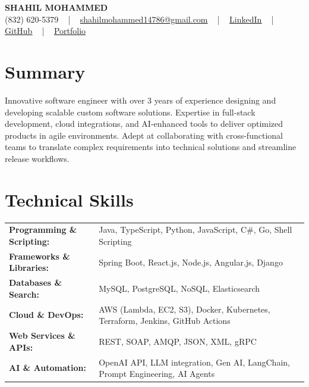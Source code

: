 \documentclass[letterpaper,11pt]{article}
\begin{document}
\begin{center}
    {\fontsize{14pt}{12pt}\selectfont \textbf{\MakeUppercase{Shahil Mohammed}}}\\ \vspace{2pt}
    \fontsize{10pt}{12pt}\selectfont (832) 620-5379 ~ | ~ \href{mailto:shahilmohammed14786@gmail.com}{shahilmohammed14786@gmail.com} ~ | ~  
    \href{https://www.linkedin.com/in/shahil-mohammed-9652931a1/}{\color{blue}\underline{LinkedIn}}  ~ | ~ 
    \href{https://github.com/freakbeast14}{\color{blue}\underline{GitHub}} ~ | ~ 
    \href{https://shahil-mohammed.netlify.app/}{\color{blue}\underline{Portfolio}}
    \vspace{-8pt}
\end{center}

\section{Summary}
\fontsize{9pt}{10pt}\selectfont
Innovative software engineer with over 3 years of experience designing and developing scalable custom software solutions. Expertise in full-stack development, cloud integrations, and AI-enhanced tools to deliver optimized products in agile environments. Adept at collaborating with cross-functional teams to translate complex requirements into technical solutions and streamline release workflows.
 \vspace{-5pt}
 
\section{Technical Skills}
        \vspace{-14pt}
        \begin{table}[h]
            \fontsize{9pt}{10pt}\selectfont
            \begin{tabular}{p{0.3\linewidth} p{0.7\linewidth}}
                \textbf{Programming \& Scripting:} & Java, TypeScript, Python, JavaScript, C\#, Go, Shell Scripting \\
                \textbf{Frameworks \& Libraries:} & Spring Boot, React.js, Node.js, Angular.js, Django \\
                \textbf{Databases \& Search:} & MySQL, PostgreSQL, NoSQL, Elasticsearch \\
                \textbf{Cloud \& DevOps:} & AWS (Lambda, EC2, S3), Docker, Kubernetes, Terraform, Jenkins, GitHub Actions \\
                \textbf{Web Services \& APIs:} & REST, SOAP, AMQP, JSON, XML, gRPC \\
                \textbf{AI \& Automation:} & OpenAI API, LLM integration, Gen AI, LangChain, Prompt Engineering, AI Agents \\
            \end{tabular}
        \end{table}
 \vspace{-15pt}
 
\end{document}
